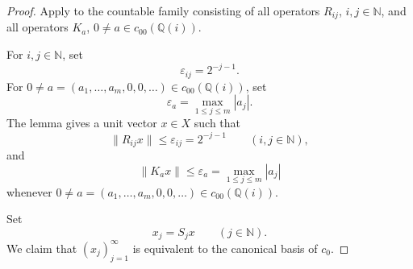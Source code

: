 \documentclass[11pt,reqno]{amsart}
\makeatletter
\theoremstyle{plain}
\theoremstyle{definition}
\newcommand{\N}{\mathbb N}
\newcounter{problempaper}
\newenvironment{problempaperbody}{%
  \setcounter{subsection}{0}%
  \setcounter{subsubsection}{0}%
  \setcounter{paragraph}{0}%
  \renewcommand{\thesubsection}{\arabic{subsection}}%
  \renewcommand{\thesubsubsection}{\thesubsection.\arabic{subsubsection}}%
  \renewcommand{\theparagraph}{\thesubsubsection.\arabic{paragraph}}%
  \let\problem@outersection\section
  \let\problem@outersubsection\subsection
  \let\problem@outersubsubsection\subsubsection
  \let\problem@outerparagraph\paragraph
  \let\section\problem@papersection
  \let\subsection\problem@papersubsection
  \let\subsubsection\problem@papersubsubsection
}{%
  \let\section\problem@outersection
  \let\subsection\problem@outersubsection
  \let\subsubsection\problem@outersubsubsection
  \let\paragraph\problem@outerparagraph
}
\newcommand{\problem@target}[2]{%
  \hypertarget{problem-\theproblempaper-#1-#2}{}%
}
\newcommand{\problem@paperheading}[3]{%
  \par\bigskip
  \problem@target{#1}{#2}%
  \noindent{\large\bfseries #2.\quad #3\par}%
  \nobreak\smallskip
}
\newcommand{\problem@papersubheading}[3]{%
  \par\medskip
  \problem@target{#1}{#2}%
  \noindent{\normalsize\bfseries #2.\quad #3\par}%
  \nobreak\smallskip
}
\newcommand{\problem@papersubsubheading}[3]{%
  \par\smallskip
  \problem@target{#1}{#2}%
  \noindent{\normalsize\itshape #2.\quad #3.\ }%
}
\def\problem@papersection{%
  \@ifstar{\problem@papersectionstar}{\problem@papersectionnostar}%
}
\def\problem@papersectionstar#1{%
  \par\bigskip\noindent{\large\bfseries #1\par}\nobreak\smallskip
}
\def\problem@papersectionnostar#1{%
  \refstepcounter{subsection}%
  \setcounter{subsubsection}{0}%
  \setcounter{paragraph}{0}%
  \problem@paperheading{section}{\thesubsection}{#1}%
  \problem@writecontentsline{section}{\thesubsection}{#1}%
}
\def\problem@papersubsection{%
  \@ifstar{\problem@papersubsectionstar}{\problem@papersubsectionnostar}%
}
\def\problem@papersubsectionstar#1{%
  \par\medskip\noindent{\normalsize\bfseries #1\par}\nobreak\smallskip
}
\def\problem@papersubsectionnostar#1{%
  \refstepcounter{subsubsection}%
  \setcounter{paragraph}{0}%
  \problem@papersubheading{subsection}{\thesubsubsection}{#1}%
  \problem@writecontentsline{subsection}{\thesubsubsection}{#1}%
}
\def\problem@papersubsubsection{%
  \@ifstar{\problem@papersubsubsectionstar}{\problem@papersubsubsectionnostar}%
}
\def\problem@papersubsubsectionstar#1{%
  \par\smallskip\noindent{\normalsize\itshape #1.\ }%
}
\def\problem@papersubsubsectionnostar#1{%
  \refstepcounter{paragraph}%
  \problem@papersubsubheading{subsubsection}{\theparagraph}{#1}%
  \problem@writecontentsline{subsubsection}{\theparagraph}{#1}%
}
\newcommand{\problem@writecontentsline}[3]{%
  \begingroup
  \protected@write\@auxout{}{%
    \string\problemcontentsentry{\theproblempaper}{#1}{#2}{#3}{\thepage}%
  }%
  \endgroup
}
\newcommand{\problemcontentsentry}[5]{%
  \@ifundefined{problemcontents@#1}{%
    \expandafter\gdef\csname problemcontents@#1\endcsname{}%
  }{}%
  \expandafter\g@addto@macro\csname problemcontents@#1\endcsname{%
    \problemcontentsline{#1}{#2}{#3}{#4}{#5}%
  }%
}
\newcommand{\problemcontentslink}[4]{%
  \hyperlink{problem-#1-#2-#3}{#4}%
}
\newcommand{\problemcontentsline}[5]{%
  \ifstrequal{#2}{section}{%
    \par\noindent
    \problemcontentslink{#1}{#2}{#3}{\makebox[2.5em][l]{#3}#4}%
    \nobreak\dotfill
    \problemcontentslink{#1}{#2}{#3}{#5}\par
  }{%
    \ifstrequal{#2}{subsection}{%
      \par\noindent\hspace*{1.5em}%
      \problemcontentslink{#1}{#2}{#3}{\makebox[3.5em][l]{#3}#4}%
      \nobreak\dotfill
      \problemcontentslink{#1}{#2}{#3}{#5}\par
    }{%
      \par\noindent\hspace*{3em}%
      \problemcontentslink{#1}{#2}{#3}{\makebox[4.5em][l]{#3}#4}%
      \nobreak\dotfill
      \problemcontentslink{#1}{#2}{#3}{#5}\par
    }%
  }%
}
\makeatother
\begin{document}
\begin{problempaperbody}
\begin{proof}
Apply  to the countable family consisting of all operators $R_{ij}$, $i,j\in\N$, and all operators $K_a$, $0\ne a\in c_{00}(\mathbb Q(i))$.

For $i,j\in\N$, set
\begin{equation*}
        \varepsilon_{ij}=2^{-j-1}.
\end{equation*}
For $0\ne a=(a_1,\ldots,a_m,0,0,\ldots)\in c_{00}(\mathbb Q(i))$, set
\begin{equation*}
        \varepsilon_a=\max_{1\leq j\leq m}|a_j|.
\end{equation*}
The lemma gives a unit vector $x\in X$ such that
\begin{equation}
\label{p2-second:eq:Rij-small}
        \|R_{ij}x\|\leq \varepsilon_{ij}=2^{-j-1} \qquad(i,j\in\N),
\end{equation}
and
\begin{equation}
\label{p2-second:eq:Ka-small}
        \|K_ax\|\leq \varepsilon_a=\max_{1\leq j\leq m}|a_j|
\end{equation}
whenever $0\ne a=(a_1,\ldots,a_m,0,0,\ldots)\in c_{00}(\mathbb Q(i))$.

Set
\begin{equation*}
        x_j=S_jx \qquad(j\in\N).
\end{equation*}
We claim that $(x_j)_{j=1}^{\infty}$ is equivalent to the canonical basis of $c_0$.


\end{proof}
\end{problempaperbody}
\end{document}
